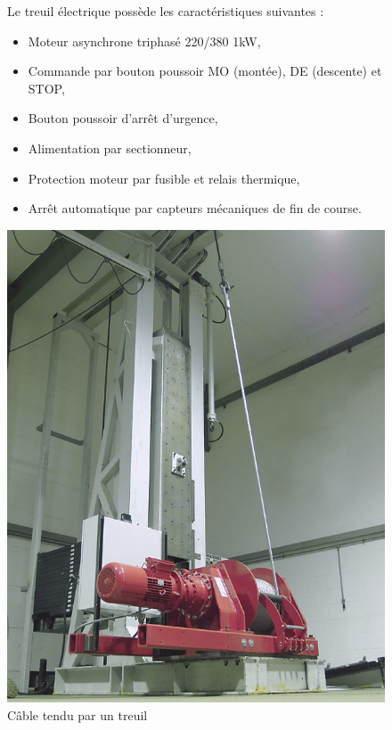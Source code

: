 \begin{figure}[htbp]
\begin{minipage}[c]{.55\linewidth}
Le treuil électrique possède les caractéristiques suivantes :
\begin{itemize}
 \item Moteur asynchrone triphasé 220/380 1kW,
 \item Commande par bouton poussoir MO (montée), DE (descente) et STOP,
 \item Bouton poussoir d'arrêt d'urgence,
 \item Alimentation par sectionneur,
 \item Protection moteur par fusible et relais thermique,
 \item Arrêt automatique par capteurs mécaniques de fin de course.
\end{itemize}
\end{minipage}
\hfill
\begin{minipage}[c]{.40\linewidth}
\begin{center}
\includegraphics[width=0.9\linewidth]{img/treuil.jpg}
\caption{Câble tendu par un treuil}
\label{fig:image12}
\end{center}
\end{minipage}
\end{figure}

